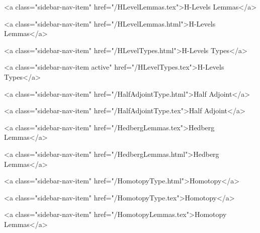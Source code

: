      
        
          <a class="sidebar-nav-item" href="/HLevelLemmas.tex">H-Levels Lemmas</a>
        
      
    
      
        
          <a class="sidebar-nav-item" href="/HLevelLemmas.html">H-Levels Lemmas</a>
        
      
    
      
        
          <a class="sidebar-nav-item" href="/HLevelTypes.html">H-Levels Types</a>
        
      
    
      
        
          <a class="sidebar-nav-item active" href="/HLevelTypes.tex">H-Levels Types</a>
        
      
    
      
        
          <a class="sidebar-nav-item" href="/HalfAdjointType.html">Half Adjoint</a>
        
      
    
      
        
          <a class="sidebar-nav-item" href="/HalfAdjointType.tex">Half Adjoint</a>
        
      
    
      
        
          <a class="sidebar-nav-item" href="/HedbergLemmas.tex">Hedberg Lemmas</a>
        
      
    
      
        
          <a class="sidebar-nav-item" href="/HedbergLemmas.html">Hedberg Lemmas</a>
        
      
    
      
        
          <a class="sidebar-nav-item" href="/HomotopyType.html">Homotopy</a>
        
      
    
      
        
          <a class="sidebar-nav-item" href="/HomotopyType.tex">Homotopy</a>
        
      
    
      
        
          <a class="sidebar-nav-item" href="/HomotopyLemmas.tex">Homotopy Lemmas</a>
        
      
    
